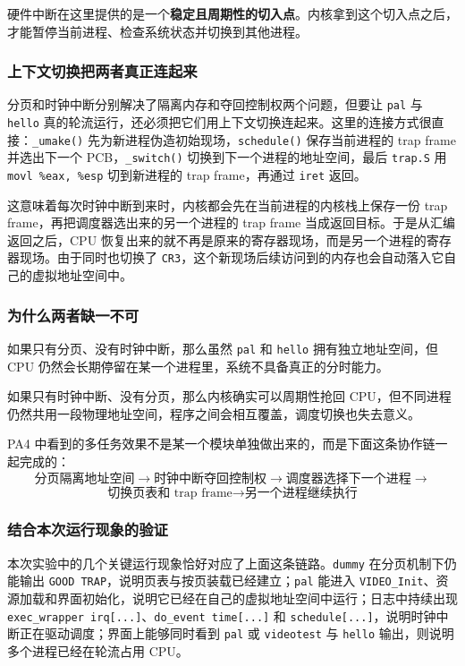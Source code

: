 \documentclass[a4paper]{article}
\begin{document}
硬件中断在这里提供的是一个\textbf{稳定且周期性的切入点}。内核拿到这个切入点之后，才能暂停当前进程、检查系统状态并切换到其他进程。

\subsubsection{上下文切换把两者真正连起来}
分页和时钟中断分别解决了隔离内存和夺回控制权两个问题，但要让 \texttt{pal} 与 \texttt{hello} 真的轮流运行，还必须把它们用上下文切换连起来。这里的连接方式很直接：\texttt{\_umake()} 先为新进程伪造初始现场，\texttt{schedule()} 保存当前进程的 trap frame 并选出下一个 PCB，\texttt{\_switch()} 切换到下一个进程的地址空间，最后 \texttt{trap.S} 用 \texttt{movl \%eax, \%esp} 切到新进程的 trap frame，再通过 \texttt{iret} 返回。

这意味着每次时钟中断到来时，内核都会先在当前进程的内核栈上保存一份 trap frame，再把调度器选出来的另一个进程的 trap frame 当成返回目标。于是从汇编返回之后，CPU 恢复出来的就不再是原来的寄存器现场，而是另一个进程的寄存器现场。由于同时也切换了 \texttt{CR3}，这个新现场后续访问到的内存也会自动落入它自己的虚拟地址空间中。

\subsubsection{为什么两者缺一不可}
如果只有分页、没有时钟中断，那么虽然 \texttt{pal} 和 \texttt{hello} 拥有独立地址空间，但 CPU 仍然会长期停留在某一个进程里，系统不具备真正的分时能力。

如果只有时钟中断、没有分页，那么内核确实可以周期性抢回 CPU，但不同进程仍然共用一段物理地址空间，程序之间会相互覆盖，调度切换也失去意义。

PA4 中看到的多任务效果不是某一个模块单独做出来的，而是下面这条协作链一起完成的：
\[
\text{分页隔离地址空间}
\rightarrow
\text{时钟中断夺回控制权}
\rightarrow
\text{调度器选择下一个进程}
\rightarrow
\]
\[
\text{切换页表和 trap frame}
\rightarrow
\text{另一个进程继续执行}
\]

\subsubsection{结合本次运行现象的验证}
本次实验中的几个关键运行现象恰好对应了上面这条链路。\texttt{dummy} 在分页机制下仍能输出 \texttt{GOOD TRAP}，说明页表与按页装载已经建立；\texttt{pal} 能进入 \texttt{VIDEO\_Init}、资源加载和界面初始化，说明它已经在自己的虚拟地址空间中运行；日志中持续出现 \texttt{exec\_wrapper irq[...]}、\texttt{do\_event time[...]} 和 \texttt{schedule[...]}，说明时钟中断正在驱动调度；界面上能够同时看到 \texttt{pal} 或 \texttt{videotest} 与 \texttt{hello} 输出，则说明多个进程已经在轮流占用 CPU。
\end{document}
